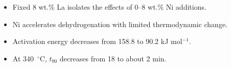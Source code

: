 \begin{itemize}
  \item Fixed 8 wt.\% La isolates the effects of 0--8 wt.\% Ni additions.
  \item Ni accelerates dehydrogenation with limited thermodynamic change.
  \item Activation energy decreases from 158.8 to 90.2 kJ mol$^{-1}$.
  \item At 340~$^{\circ}$C, $t_{90}$ decreases from 18 to about 2 min.
\end{itemize}
